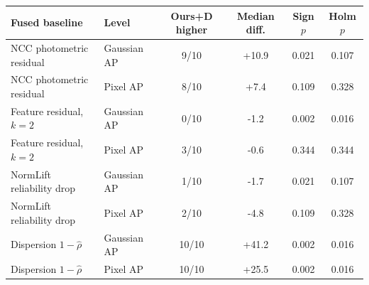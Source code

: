 \begin{tabular}{@{}llcccc@{}}
\toprule
Fused baseline & Level & Ours+D higher & Median diff. & Sign $p$ & Holm $p$\\
\midrule
NCC photometric residual & Gaussian AP & 9/10 & +10.9 & 0.021 & 0.107\\
NCC photometric residual & Pixel AP & 8/10 & +7.4 & 0.109 & 0.328\\
Feature residual, $k=2$ & Gaussian AP & 0/10 & -1.2 & 0.002 & 0.016\\
Feature residual, $k=2$ & Pixel AP & 3/10 & -0.6 & 0.344 & 0.344\\
NormLift reliability drop & Gaussian AP & 1/10 & -1.7 & 0.021 & 0.107\\
NormLift reliability drop & Pixel AP & 2/10 & -4.8 & 0.109 & 0.328\\
Dispersion $1-\hat\rho$ & Gaussian AP & 10/10 & +41.2 & 0.002 & 0.016\\
Dispersion $1-\hat\rho$ & Pixel AP & 10/10 & +25.5 & 0.002 & 0.016\\
\bottomrule
\end{tabular}
